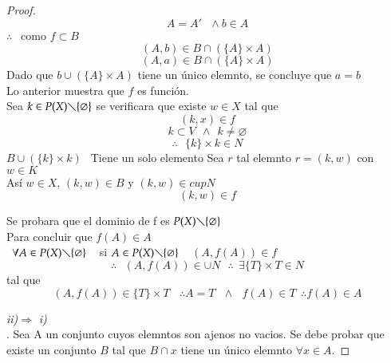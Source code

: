 \begin{proof}
 $$ A=A' \ \ \ \wedge b \in A  $$ 
$\therefore \ \ $ como $ f \subset B $
$$ (A,b) \in B \cap (\lbrace A \rbrace \times A) $$
$$ (A,a) \in B \cap (\lbrace A \rbrace \times A ) $$
Dado que $ b \cup (\lbrace  A \rbrace \times A)  $ tiene un único elemnto, se concluye  que $ a=b $\\
Lo anterior muestra que $ f $ es función.\\
Sea $ k \in P(X) \diagdown \lbrace \varnothing \rbrace  $ se verificara que existe $ w \in X $ tal que 
$$ (k,x) \in f $$
$$ k \subset V  \  \ \wedge  \  \   k \neq \varnothing $$
$$ \therefore \ \ \ \lbrace k \rbrace  \times k \in N $$
$ B \cup ( \lbrace k \rbrace \times k)  \ \ $ Tiene un solo elemento
Sea  $ r $ tal elemnto $ r=(k,w) $ con $ w \in K $\\
Así $ w \in X $,  $ (k,w) \in B $ y $ (k,w) \in cup N $
$$ (k,w) \in f $$

Se probara que el dominio de f es $ P(X) \diagdown \lbrace \varnothing \rbrace $\\
Para concluir que $ f(A) \in A $\\
$ \ \ \forall A  \in P(X) \diagdown \lbrace \varnothing  \rbrace  \ \ \ $ si $ A  \in P(X) \diagdown \lbrace \varnothing  \rbrace \ \ \ $  $ (A,f(A)) \in f $ 
$$  \therefore \ \ \  (A,f(A)) \in \cup N \ \  \ \therefore \  \ \exists \lbrace T \rbrace \times T \in N $$ tal que 
$$ (A,f(A)) \in \lbrace T \rbrace \times T \  \ \ \ \therefore A=T \ \ \ \wedge  \ \ \ f(A) \in T \ \ \therefore f(A) \in A $$

 \newpage
\textit{ii)}$ \Rightarrow $ \textit{i)}\\.
Sea  A un conjunto cuyos elemntos son ajenos no vacios. Se debe probar  que existe un conjunto $ B $ tal que  $ B \cap x $ tiene un único elemnto  $ \forall x \in A $.


\end{proof}
